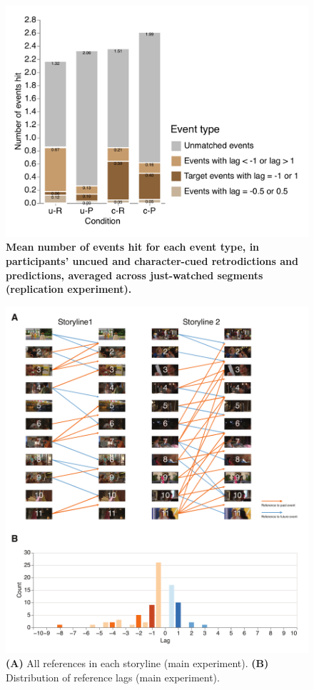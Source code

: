 \documentclass[10pt]{article}
\begin{document}
\begin{figure}[tp]
    \centering
    \includegraphics[width=\textwidth]{supp2_rep}
    \caption{\textbf{Mean number of events hit for each event type, in participants' uncued and character-cued retrodictions and predictions, averaged across just-watched segments (replication experiment).}}
    \label{fig:supp2_rep}
\end{figure}

\begin{figure}[tp]
    \centering
    \includegraphics[width=\textwidth]{supp3}
    \caption{\textbf{(A)} All references in each storyline (main experiment). \textbf{(B)} Distribution of reference lags (main experiment).}
    \label{fig:supp3}
\end{figure}
\end{document}

